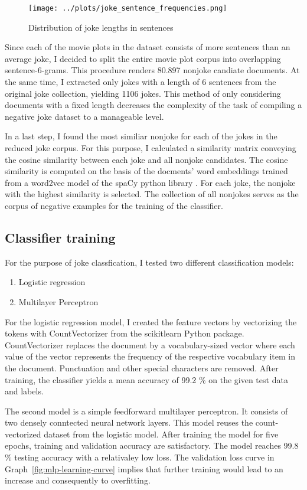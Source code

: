 \documentclass[12pt]{scrartcl}
\begin{document}
\begin{figure}
    \texttt{[image: ../plots/joke\_sentence\_frequencies.png]}
    \caption{Distribution of joke lengths in sentences}
    \label{fig:jokelengths}
\end{figure}

Since each of the movie plots in the dataset consists of more sentences than an average joke, I decided to split the entire movie plot corpus into overlapping sentence-6-grams.
This procedure renders 80.897 nonjoke candiate documents. 
At the same time, I extracted only jokes with a length of 6 sentences from the original joke collection, yielding 1106 jokes.
This method of only considering documents with a fixed length decreases the complexity of the task of compiling a negative joke dataset to a manageable level. 

In a last step, I found the most similiar nonjoke for each of the jokes in the reduced joke corpus. 
For this purpose, I calculated a similarity matrix conveying the cosine similarity between each joke and all nonjoke candidates.
The cosine similarity is computed on the basis of the docments' word embeddings trained from a word2vec model of the spaCy python library \citep{spacy2}.
For each joke, the nonjoke with the highest similarity is selected.
The collection of all nonjokes serves as the corpus of negative examples for the training of the classifier. 


\subsection{Classifier training}
For the purpose of joke classfication, I tested two different classification models:
\begin{enumerate}
    \item Logistic regression
    \item Multilayer Perceptron
\end{enumerate}

For the logistic regression model, I created the feature vectors by vectorizing the tokens with CountVectorizer from the scikitlearn Python package.
CountVectorizer replaces the document by a vocabulary-sized vector where each value of the vector represents the frequency of the respective vocabulary item in the document.
Punctuation and other special characters are removed. After training, the classifier yields a mean accuracy of 99.2 \% on the given test data and labels.

The second model is a simple feedforward multilayer perceptron.
It consists of two densely conntected neural network layers.
This model reuses the count-vectorized dataset from the logistic model.
After training the model for five epochs, training and validation accuracy are satisfactory.
The model reaches 99.8 \% testing accuracy with a relativaley low loss. 
The validation loss curve in Graph~\ref{fig:mlp-learning-curve} implies that further training would lead to an increase and consequently to overfitting.
\end{document}

